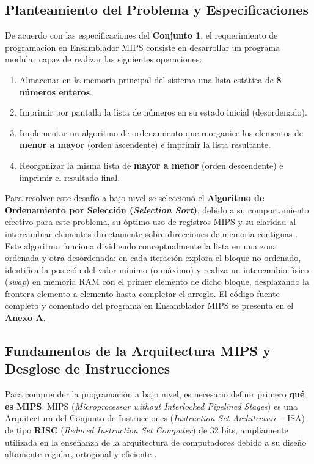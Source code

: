 \documentclass[12pt,a4paper]{article}
\begin{document}
\subsection{Planteamiento del Problema y Especificaciones}
De acuerdo con las especificaciones del \textbf{Conjunto 1}, el requerimiento de programación en Ensamblador MIPS consiste en desarrollar un programa modular capaz de realizar las siguientes operaciones:
\begin{enumerate}[leftmargin=*]
    \item Almacenar en la memoria principal del sistema una lista estática de \textbf{8 números enteros}.
    \item Imprimir por pantalla la lista de números en su estado inicial (desordenado).
    \item Implementar un algoritmo de ordenamiento que reorganice los elementos de \textbf{menor a mayor} (orden ascendente) e imprimir la lista resultante.
    \item Reorganizar la misma lista de \textbf{mayor a menor} (orden descendente) e imprimir el resultado final.
\end{enumerate}

Para resolver este desafío a bajo nivel se seleccionó el \textbf{Algoritmo de Ordenamiento por Selección (\textit{Selection Sort})}, debido a su comportamiento efectivo para este problema, su óptimo uso de registros MIPS y su claridad al intercambiar elementos directamente sobre direcciones de memoria contiguas \cite{patterson}. Este algoritmo funciona dividiendo conceptualmente la lista en una zona ordenada y otra desordenada: en cada iteración explora el bloque no ordenado, identifica la posición del valor mínimo (o máximo) y realiza un intercambio físico (\textit{swap}) en memoria RAM con el primer elemento de dicho bloque, desplazando la frontera elemento a elemento hasta completar el arreglo. El código fuente completo y comentado del programa en Ensamblador MIPS se presenta en el \textbf{Anexo A}.

\subsection{Fundamentos de la Arquitectura MIPS y Desglose de Instrucciones}

Para comprender la programación a bajo nivel, es necesario definir primero \textbf{qué es MIPS}. MIPS (\textit{Microprocessor without Interlocked Pipelined Stages}) es una Arquitectura del Conjunto de Instrucciones (\textit{Instruction Set Architecture} -- ISA) de tipo \textbf{RISC} (\textit{Reduced Instruction Set Computer}) de 32 bits, ampliamente utilizada en la enseñanza de la arquitectura de computadores debido a su diseño altamente regular, ortogonal y eficiente \cite{patterson}.
\end{document}

